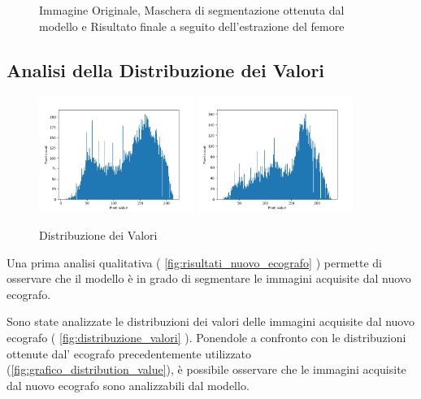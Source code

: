 \begin{figure}[!ht]
\begin{minipage}{0.32\textwidth}
	\end{minipage}
	\caption{Immagine Originale, Maschera di segmentazione ottenuta dal modello e Risultato finale a seguito dell'estrazione del femore}
	\label{fig:risultati_nuovo_ecografo}
\end{figure}

\subsection{Analisi della Distribuzione dei Valori}
\label{subsec:analisi_distribuzione_valori}

\begin{figure}[!ht]
	\centering
	\includegraphics[width=0.45\textwidth]{./Immagini/nuovo_ecografo_results/hist_0_distribution_value.csv.png}
	\includegraphics[width=0.45\textwidth]{./Immagini/nuovo_ecografo_results/hist_3_distribution_value.csv.png}
	\caption{Distribuzione dei Valori}
	\label{fig:distribuzione_valori}
\end{figure}

Una prima analisi qualitativa ( \autoref{fig:risultati_nuovo_ecografo} ) permette di osservare che il modello è in grado di segmentare le immagini acquisite dal nuovo ecografo.

Sono state analizzate le distribuzioni dei valori delle immagini acquisite dal
nuovo ecografo ( \autoref{fig:distribuzione_valori} ). Ponendole a confronto con le distribuzioni ottenute dal'
ecografo precedentemente utilizzato (\autoref{fig:grafico_distribution_value}), è possibile osservare che le immagini acquisite dal nuovo ecografo sono analizzabili
dal modello.

